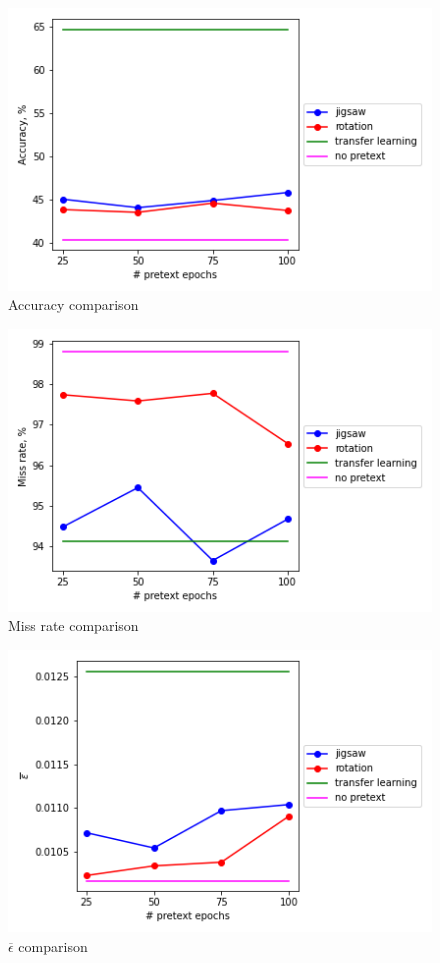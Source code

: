 \begin{figure}
    \includegraphics{images/acc}
    \caption{\label{fig:figure-1}Accuracy comparison}
\end{figure}

\begin{figure}
    \includegraphics{images/miss_rate}
    \caption{\label{fig:figure-2}Miss rate comparison}
\end{figure}

\begin{figure}
    \includegraphics{images/eps}
    \caption{\label{fig:figure-3}$\overline{\epsilon}$ comparison}
\end{figure}



